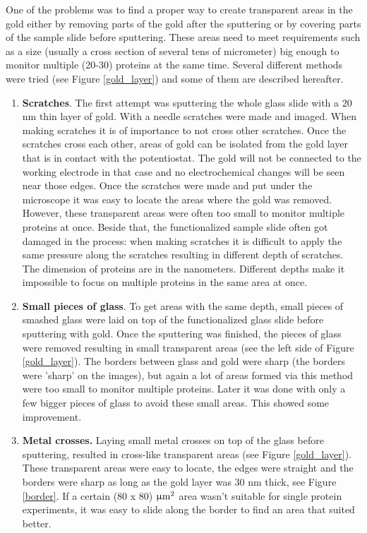 \documentclass[twoside,single]{lion-msc}
\begin{document}
One of the problems was to find a proper way to create transparent areas in the gold either by removing parts of the gold after the sputtering or by covering parts of the sample slide before sputtering. These areas need to meet requirements such as a size (usually a cross section of several tens of micrometer) big enough to monitor multiple (20-30) proteins at the same time.
Several different methods were tried (see Figure \ref{gold_layer}) and some of them are described hereafter.
\begin{enumerate}
\item \textbf{Scratches}. The first attempt was sputtering the whole glass slide with a 20 nm thin layer of gold. With a needle scratches were made and imaged. When making scratches it is of importance to not cross other scratches. Once the scratches cross each other, areas of gold can be isolated from the gold layer that is in contact with the potentiostat. The gold will not be connected to the working electrode in that case and no electrochemical changes will be seen near those edges. Once the scratches were made and put under the microscope it was easy to locate the areas where the gold was removed. However, these transparent areas were often too small to monitor multiple proteins at once. Beside that, the functionalized sample slide often got damaged in the process: when making scratches it is difficult to apply the same pressure along the scratches resulting in different depth of scratches. The dimension of proteins are in the nanometers. Different depths make it impossible to focus on multiple proteins in the same area at once.
\item \textbf{Small pieces of glass}. To get areas with the same depth, small pieces of smashed glass were laid on top of the functionalized glass slide before sputtering with gold. Once the sputtering was finished, the pieces of glass were removed resulting in small transparent areas (see the left side of Figure \ref{gold_layer}). The borders between glass and gold were sharp (the borders were 'sharp' on the images), but again a lot of areas formed via this method were too small to monitor multiple proteins. Later it was done with only a few bigger pieces of glass to avoid these small areas. This showed some improvement. 
\item \textbf{Metal crosses.} Laying small metal crosses on top of the glass before sputtering, resulted in cross-like transparent areas (see Figure \ref{gold_layer}). These transparent areas were easy to locate, the edges were straight and the borders were sharp as long as the gold layer was 30 nm thick, see Figure \ref{border}. If a certain (80 x 80) $\upmu \textup{m}^{2}$ area wasn't suitable for single protein experiments, it was easy to slide along the border to find an area that suited better. 
\end{enumerate}
\end{document}
